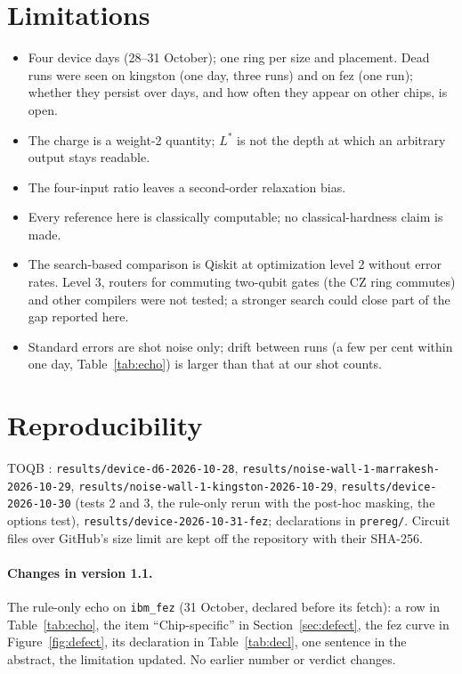 \documentclass[11pt]{article}
\begin{document}
\section{Limitations}
\begin{itemize}
\item Four device days (28--31 October); one ring per size and placement. Dead runs were seen on kingston (one day, three runs) and on fez
  (one run); whether they persist over days, and how often they appear on other chips, is open.
\item The charge is a weight-2 quantity; $L^*$ is not the depth at which an arbitrary output stays readable.
\item The four-input ratio leaves a second-order relaxation bias.
\item Every reference here is classically computable; no classical-hardness claim is made.
\item The search-based comparison is Qiskit at optimization level 2 without error rates. Level 3, routers for
  commuting two-qubit gates (the CZ ring commutes) and other compilers were not tested; a stronger search could
  close part of the gap reported here.
\item Standard errors are shot noise only; drift between runs (a few per cent within one day, Table~\ref{tab:echo})
  is larger than that at our shot counts.
\end{itemize}

\section{Reproducibility}
TOQB \cite{toqb}: \texttt{results/device-d6-2026-10-28}, \texttt{results/noise-wall-1-marrakesh-2026-10-29},
\texttt{results/noise-wall-1-kingston-2026-10-29}, \texttt{results/device-2026-10-30} (tests 2 and 3, the rule-only
rerun with the post-hoc masking, the options test), \texttt{results/device-2026-10-31-fez}; declarations in
\texttt{prereg/}. Circuit files over GitHub's size limit are kept off the repository with their SHA-256.

\paragraph{Changes in version 1.1.} The rule-only echo on \texttt{ibm\_fez} (31 October, declared before its fetch):
a row in Table~\ref{tab:echo}, the item ``Chip-specific'' in Section~\ref{sec:defect}, the fez curve in
Figure~\ref{fig:defect}, its declaration in Table~\ref{tab:decl}, one sentence in the abstract, the limitation
updated. No earlier number or verdict changes.
\end{document}
